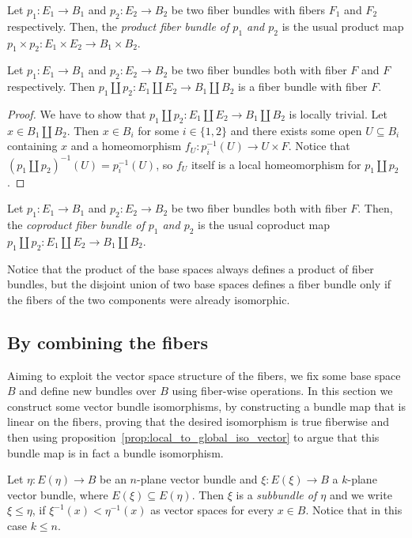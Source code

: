 \begin{definition} Let $p_1:E_1\to B_1$ and $p_2:E_2\to B_2$ be two fiber bundles with fibers $F_1$ and $F_2$ respectively. Then, the \emph{product fiber bundle of $p_1$ and $p_2$} is the usual product map $p_1\times p_2:E_1\times E_2\to B_1\times B_2$.
\end{definition}

\begin{proposition} Let $p_1:E_1\to B_1$ and $p_2:E_2\to B_2$ be two fiber bundles both with fiber $F$ and $F$ respectively. Then $p_1\amalg p_2:E_1\amalg E_2\to B_1\amalg B_2$ is a fiber bundle with fiber $F$.
\end{proposition}
\begin{proof} We have to show that $p_1\amalg p_2:E_1\amalg E_2\to B_1\amalg B_2$ is locally trivial. Let $x\in B_1\amalg B_2$. Then $x\in B_i$ for some $i\in\{1,2\}$ and there exists some open $U\subseteq B_i$ containing $x$ and a homeomorphism $f_U:p_i^{-1}(U)\to U\times F$. Notice that $(p_1\amalg p_2)^{-1}(U)=p_i^{-1}(U)$, so $f_U$ itself is a local homeomorphism for $p_1\amalg p_2$.
\end{proof}

\begin{definition} Let $p_1:E_1\to B_1$ and $p_2:E_2\to B_2$ be two fiber bundles both with fiber $F$. Then, the \emph{coproduct fiber bundle of $p_1$ and $p_2$} is the usual coproduct map $p_1\amalg p_2:E_1\amalg E_2\to B_1\amalg B_2$.
\end{definition}
Notice that the product of the base spaces always defines a product of fiber bundles, but the disjoint union of two base spaces defines a fiber bundle only if the fibers of the two components were already isomorphic.

\subsection{By combining the fibers}
Aiming to exploit the vector space structure of the fibers, we fix some base space $B$ and define new bundles over $B$ using fiber-wise operations. In this section we construct some vector bundle isomorphisms, by constructing a bundle map that is linear on the fibers, proving that the desired isomorphism is true fiberwise and then using proposition~\ref{prop:local_to_global_iso_vector} to argue that this bundle map is in fact a bundle isomorphism.

\begin{definition} Let $\eta:E(\eta)\to B$ be an $n$-plane vector bundle and $\xi:E(\xi)\to B$ a $k$-plane vector bundle, where $E(\xi)\subseteq E(\eta)$. Then $\xi$ is a \emph{subbundle of $\eta$} and we write $\xi\leq\eta$, if $\xi^{-1}(x)<\eta^{-1}(x)$ as vector spaces for every $x\in B$. Notice that in this case $k\leq n$.
\end{definition}

